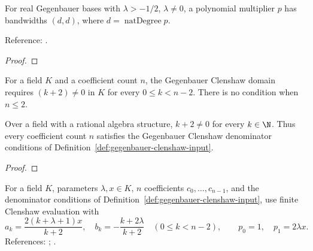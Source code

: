 \begin{theorem}
\label{thm:gegenbauer-polynomial-multiplication}
\leanok
For real Gegenbauer bases with $\lambda>-1/2$, $\lambda\ne0$, a polynomial
multiplier $p$ has bandwidths $(d,d)$, where $d=\operatorname{natDegree}p$.

Reference: \cite[Sections 2--3]{olver-townsend}.
\end{theorem}
\begin{proof}
\leanok
\end{proof}

\begin{supporting}
\begin{definition}
\label{def:gegenbauer-clenshaw-input}
\leanok
For a field $K$ and a coefficient count $n$, the Gegenbauer Clenshaw domain requires $(k+2)\ne0$ in $K$ for every $0\le k<n-2$.
There is no condition when $n\le2$.
\end{definition}

\begin{theorem}
\label{thm:gegenbauer-clenshaw-input}
\leanok
Over a field with a rational algebra structure, $k+2\ne0$ for every
$k\in\N$. Thus every coefficient count $n$ satisfies the Gegenbauer Clenshaw
denominator conditions of Definition~\ref{def:gegenbauer-clenshaw-input}.
\end{theorem}
\begin{proof}
\leanok
\end{proof}

\begin{definition}
\label{def:gegenbauer-clenshaw}
\leanok
For a field $K$, parameters $\lambda,x\in K$, $n$ coefficients $c_0,\ldots,c_{n-1}$, and the denominator conditions of Definition~\ref{def:gegenbauer-clenshaw-input}, use finite Clenshaw evaluation with
\[
 a_k=\frac{2(k+\lambda+1)x}{k+2},\quad
 b_k=-\frac{k+2\lambda}{k+2}\quad(0\le k<n-2),\qquad
 p_0=1,\quad p_1=2\lambda x.
\]
References: \cite{clenshaw}; \cite[Table 18.9.1]{dlmf}.
\end{definition}


\end{supporting}
